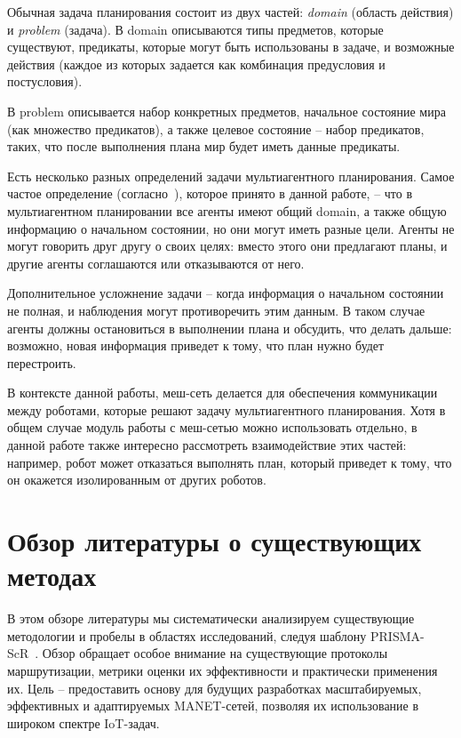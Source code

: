 \documentclass[%
]{report}
\begin{document}
Обычная задача планирования состоит из двух частей:
\emph{domain} (область действия) и \emph{problem} (задача).
В domain описываются типы предметов, которые существуют,
предикаты, которые могут быть использованы в задаче,
и возможные действия (каждое из которых задается как комбинация предусловия и постусловия).

В problem описывается набор конкретных предметов,
начальное состояние мира (как множество предикатов),
а также целевое состояние -- набор предикатов, таких, что
после выполнения плана мир будет иметь данные предикаты.

Есть несколько разных определений задачи мультиагентного планирования.
Самое частое определение (согласно~\cite{doi:10.3233/MGS-2009-0133}),
которое принято в данной работе, --
что в мультиагентном планировании
все агенты имеют общий domain,
а также общую информацию о начальном состоянии,
но они могут иметь разные цели.
Агенты не могут говорить друг другу о своих целях:
вместо этого они предлагают планы,
и другие агенты соглашаются или отказываются от него.

Дополнительное усложнение задачи --
когда информация о начальном состоянии не полная,
и наблюдения могут противоречить этим данным.
В таком случае агенты должны остановиться в выполнении плана
и обсудить, что делать дальше:
возможно, новая информация приведет к тому, что план нужно будет перестроить.

В контексте данной работы, меш-сеть делается для обеспечения коммуникации между роботами,
которые решают задачу мультиагентного планирования.
Хотя в общем случае модуль работы с меш-сетью можно использовать отдельно,
в данной работе также интересно рассмотреть взаимодействие этих частей:
например, робот может отказаться выполнять план,
который приведет к тому, что он окажется изолированным от других роботов.


\chapter{Обзор литературы о существующих методах}

В этом обзоре литературы мы
систематически анализируем существующие методологии
и пробелы в областях исследований,
следуя шаблону PRISMA-ScR~\cite{prisma-src}.
Обзор обращает особое внимание на
существующие протоколы маршрутизации,
метрики оценки их эффективности и практически применения их.
Цель -- предоставить основу для будущих разработках
масштабируемых, эффективных и адаптируемых
MANET-сетей,
позволяя их использование в широком спектре IoT-задач.
\end{document}
